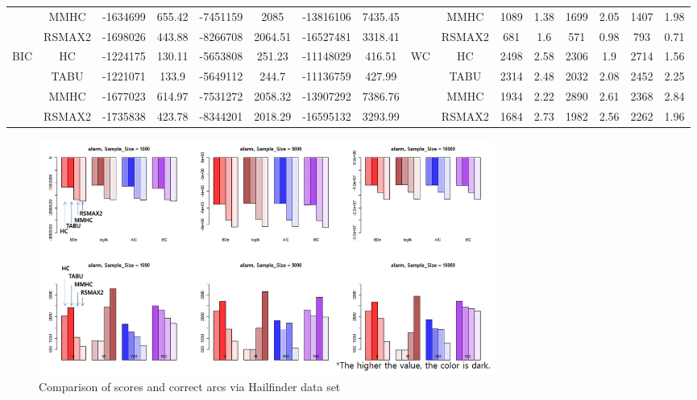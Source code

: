 \begin{table}[p]
{\begin{tabular}{cc||cc|cc|cc||cc|cc|cc|cc}
& MMHC &	-1634699 & 	655.42 & 	-7451159 & 	2085 & 	-13816106 & 	7435.45 & 	& MMHC &	1089 & 	1.38 & 	1699 & 	2.05 & 	1407 & 	1.98\tabularnewline													
& RSMAX2 &	-1698026 & 	443.88 & 	-8266708 & 	2064.51 & 	-16527481 & 	3318.41 & 	& RSMAX2 &	681 & 	1.6 & 	571 & 	0.98 & 	793 & 	0.71\tabularnewline													
\hline																										
\multirow{4}{*}{BIC} & HC &	-1224175 & 	130.11 & 	-5653808 & 	251.23 & 	-11148029 & 	416.51 & 	\multirow{4}{*}{WC} & HC &	2498 & 	2.58 & 	2306 & 	1.9 & 	2714 & 	1.56\tabularnewline													
& TABU &	-1221071 & 	133.9 & 	-5649112 & 	244.7 & 	-11136759 & 	427.99 & 	& TABU &	2314 & 	2.48 & 	2032 & 	2.08 & 	2452 & 	2.25\tabularnewline													
& MMHC &	-1677023 & 	614.97 & 	-7531272 & 	2058.32 & 	-13907292 & 	7386.76 & 	& MMHC &	1934 & 	2.22 & 	2890 & 	2.61 & 	2368 & 	2.84\tabularnewline													
& RSMAX2 &	-1735838 & 	423.78 & 	-8344201 & 	2018.29 & 	-16595132 & 	3293.99 & 	& RSMAX2 &	1684 & 	2.73 & 	1982 & 	2.56 & 	2262 & 	1.96\tabularnewline													
\hline																										
\end{tabular}																										
}																										
\end{table}

	\begin{figure}[p]
	\centering
		\includegraphics[height=220pt]{Real_3_Alarm}
		\caption{Comparison of scores and correct arcs via Hailfinder data set}
	\end{figure}	